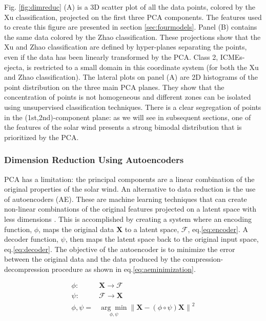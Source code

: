 Fig. \ref{fig:dimreduc} (A) is a 3D scatter plot of all the data points, colored by the Xu classification, projected on the first three PCA components. The features used to create this figure are presented in section \ref{sec:fourmodels}. Panel (B) contains the same data colored by the Zhao classification. These projections show that the Xu and Zhao classification are defined by hyper-planes separating the points, even if the data has been linearly transformed by the PCA. Class 2, ICMEs-ejecta, is restricted to a small domain in this coordinate system (for both the Xu and Zhao classification). The lateral plots on panel (A) are 2D histograms of the point distribution on the three main PCA planes. They show that the concentration of points is not homogeneous and different zones can be isolated using unsupervised classification techniques. There is a clear segregation of points in the (1st,2nd)-component plane: as we will see in subsequent sections, one of the features of the solar wind presents a strong bimodal distribution that is prioritized by the PCA.

\subsubsection{Dimension Reduction Using Autoencoders}
\label{sec:reducae}
PCA has a limitation: the principal components are a linear combination of the original properties of the solar wind. An alternative to data reduction is the use of autoencoders (AE). These are machine learning techniques that can create non-linear combinations of the original features projected on a latent space with less dimensions \citep{Hinton2006}. This is accomplished by creating a system where an encoding function, $\phi$, maps the original data $\boldsymbol{X}$ to a latent space, $\boldsymbol{\mathcal{F}}$, eq.\eqref{eq:encoder}. A decoder function, $\psi$, then maps the latent space back to the original input space, eq.\eqref{eq:decoder}. The objective of the autoencoder is to minimize the error between the original data and the data produced by the compression-decompression procedure as shown in eq.\eqref{eq:aeminimization}.

\begin{align}
\phi: & \boldsymbol{X} \rightarrow \boldsymbol{\mathcal{F}} \label{eq:encoder}\\
\psi: & \boldsymbol{\mathcal{F}} \rightarrow \boldsymbol{X} \label{eq:decoder} \\
\phi,\psi = & \underset{\phi,\psi}{\arg \min} \left\lVert \boldsymbol{X} - (\phi \circ \psi) \boldsymbol{X} \right\rVert^2 \label{eq:aeminimization}
\end{align}

